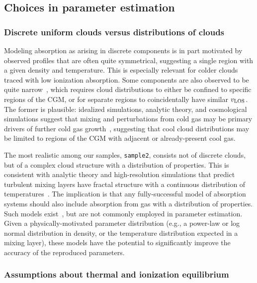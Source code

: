 \documentclass[fleqn,usenatbib]{mnras}
\begin{document}
\subsection{Choices in parameter estimation}
\label{s: discussion -- modeling choices}

\subsubsection{Discrete uniform clouds versus distributions of clouds}

Modeling absorption as arising in discrete components is in part motivated by observed profiles that are often quite symmetrical,
suggesting a single region with a given density and temperature. 
This is especially relevant for colder clouds traced with low ionization absorption.
Some components are also observed to be quite narrow~\citep[e.g.][]{churchill1999Population, churchill2001Kinematics}, 
which requires cloud distributions to either be confined to specific regions of the CGM,
or for separate regions to coincidentally have similar $v_{\rm LOS}$.
The former is plausible:
idealized simulations, analytic theory, and cosmological simulations suggest that mixing and perturbations from cold gas may be primary drivers of further cold gas growth~\citep[e.g.][]{nelson2020Resolving, esmerian2021Thermal, gronke2021Survival, gronke2022Cooling, ramesh2022Circumgalactic},
suggesting that cool cloud distributions may be limited to regions of the CGM with adjacent or already-present cool gas.

The most realistic among our samples, \texttt{sample2}, consists not of discrete clouds, but of a complex cloud structure with a distribution of properties.
This is consistent with analytic theory and high-resolution simulations that predict turbulent mixing layers have fractal structure with a continuous distribution of temperatures~\citep[e.g.][]{Tan2021Model}.
The implication is that any fully-successful model of absorption systems should also include absorption from gas with a distribution of properties.
Such models exist~\citep[e.g.][]{stern2016Universal}, but are not commonly employed in parameter estimation.
Given a physically-motivated parameter distribution (e.g., a power-law or log normal distribution in density, or the temperature distribution expected in a mixing layer),
these models have the potential to significantly improve the accuracy of the reproduced parameters.

\subsubsection{Assumptions about thermal and ionization equilibrium}
\end{document}

